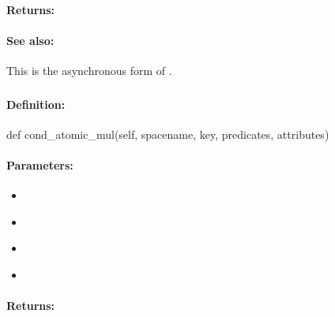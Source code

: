 \paragraph{Returns:}


\paragraph{See also:}  This is the asynchronous form of .

\pagebreak
\subsubsection{}
\label{api:python:cond_atomic_mul}


\paragraph{Definition:}
\begin{pythoncode}
def cond_atomic_mul(self, spacename, key, predicates, attributes)
\end{pythoncode}

\paragraph{Parameters:}
\begin{itemize}[noitemsep]
\item {}\\

\item {}\\

\item {}\\

\item {}\\

\end{itemize}

\paragraph{Returns:}


